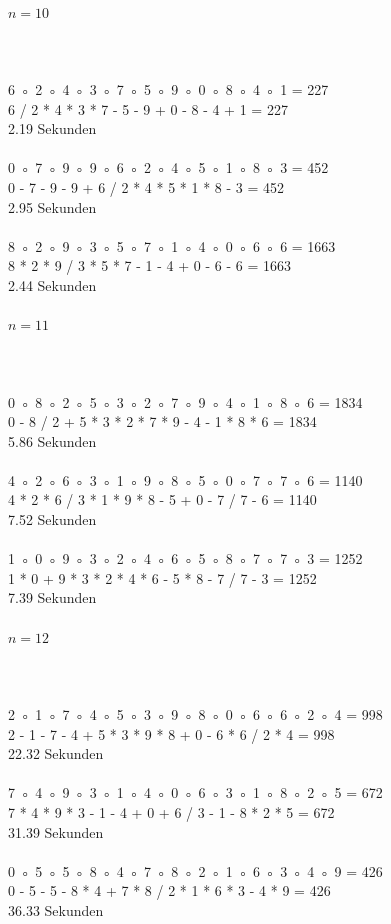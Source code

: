 \documentclass[a4paper,10pt,ngerman]{scrartcl}
\begin{document}
\paragraph{$n=10$} \hrulefill
\\
\\
6 ◦ 2 ◦ 4 ◦ 3 ◦ 7 ◦ 5 ◦ 9 ◦ 0 ◦ 8 ◦ 4 ◦ 1 = 227\\
6 / 2 * 4 * 3 * 7 - 5 - 9 + 0 - 8 - 4 + 1 = 227\\
2.19 Sekunden\\
\\
0 ◦ 7 ◦ 9 ◦ 9 ◦ 6 ◦ 2 ◦ 4 ◦ 5 ◦ 1 ◦ 8 ◦ 3 = 452\\
0 - 7 - 9 - 9 + 6 / 2 * 4 * 5 * 1 * 8 - 3 = 452\\
2.95 Sekunden\\
\\
8 ◦ 2 ◦ 9 ◦ 3 ◦ 5 ◦ 7 ◦ 1 ◦ 4 ◦ 0 ◦ 6 ◦ 6 = 1663\\
8 * 2 * 9 / 3 * 5 * 7 - 1 - 4 + 0 - 6 - 6 = 1663\\
2.44 Sekunden\\
\paragraph{$n=11$} \hrulefill
\\
\\
0 ◦ 8 ◦ 2 ◦ 5 ◦ 3 ◦ 2 ◦ 7 ◦ 9 ◦ 4 ◦ 1 ◦ 8 ◦ 6 = 1834\\
0 - 8 / 2 + 5 * 3 * 2 * 7 * 9 - 4 - 1 * 8 * 6 = 1834\\
5.86 Sekunden\\
\\
4 ◦ 2 ◦ 6 ◦ 3 ◦ 1 ◦ 9 ◦ 8 ◦ 5 ◦ 0 ◦ 7 ◦ 7 ◦ 6 = 1140\\
4 * 2 * 6 / 3 * 1 * 9 * 8 - 5 + 0 - 7 / 7 - 6 = 1140\\
7.52 Sekunden\\
\\
1 ◦ 0 ◦ 9 ◦ 3 ◦ 2 ◦ 4 ◦ 6 ◦ 5 ◦ 8 ◦ 7 ◦ 7 ◦ 3 = 1252\\
1 * 0 + 9 * 3 * 2 * 4 * 6 - 5 * 8 - 7 / 7 - 3 = 1252\\
7.39 Sekunden\\
\paragraph{$n=12$} \hrulefill
\\
\\
2 ◦ 1 ◦ 7 ◦ 4 ◦ 5 ◦ 3 ◦ 9 ◦ 8 ◦ 0 ◦ 6 ◦ 6 ◦ 2 ◦ 4 = 998\\
2 - 1 - 7 - 4 + 5 * 3 * 9 * 8 + 0 - 6 * 6 / 2 * 4 = 998\\
22.32 Sekunden\\
\\
7 ◦ 4 ◦ 9 ◦ 3 ◦ 1 ◦ 4 ◦ 0 ◦ 6 ◦ 3 ◦ 1 ◦ 8 ◦ 2 ◦ 5 = 672\\
7 * 4 * 9 * 3 - 1 - 4 + 0 + 6 / 3 - 1 - 8 * 2 * 5 = 672\\
31.39 Sekunden\\
\\
0 ◦ 5 ◦ 5 ◦ 8 ◦ 4 ◦ 7 ◦ 8 ◦ 2 ◦ 1 ◦ 6 ◦ 3 ◦ 4 ◦ 9 = 426\\
0 - 5 - 5 - 8 * 4 + 7 * 8 / 2 * 1 * 6 * 3 - 4 * 9 = 426\\
36.33 Sekunden\\
\end{document}
